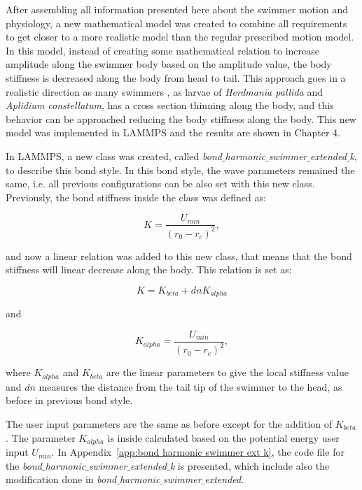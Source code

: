 After assembling all information presented here about the swimmer motion and physiology, a new mathematical model was created to combine all requirements to get closer to a more
realistic model than the regular prescribed motion model. In this model, instead of creating some mathematical relation to increase amplitude along the swimmer body based on the
amplitude value, the body stiffness is decreased along the body from head to tail. This  approach goes in a realistic direction as many swimmers , as larvae of \textit{Herdmania pallida} and
\textit{Aplidium constellatum}, has a cross section thinning along the body, and this behavior can be approached reducing the body stiffness along the body. This new model was
implemented in LAMMPS and the results are shown in Chapter 4. \par

In LAMMPS, a new class was created, called \textit{bond$\_$harmonic$\_$swimmer$\_$extended$\_$k}, to describe this bond style. In this bond style, the wave parameters remained the same, i.e. all previous configurations can be also set with this new class. 
Previously, the bond stiffness inside the class was defined as:

\begin{equation}
 K = \frac{U_{min}}{( r_{0} - r_{c})^2} ,
\end{equation}

and now a linear relation was added to this new class, that means that the bond stiffness will linear decrease along the body. This relation is set as:

\begin{equation}
 K = K_{beta} + dn K_{alpha}
\end{equation}

and

\begin{equation}
 K_{alpha} = \frac{U_{min}}{( r_{0} - r_{c})^2} ,
\end{equation}


where $K_{alpha}$ and $K_{beta}$ are the linear parameters to give the local stiffness value and $dn$ measures the distance from the tail tip of the swimmer to the head, as before
in previous bond style.\par

The user input parameters are the same as before except for the addition of $K_{beta}$. The parameter $K_{alpha}$ is inside calculated based on the potential energy user
input $U_{min}$. In Appendix~\ref{app:bond harmonic swimmer ext k}, the code file for the \textit{bond$\_$harmonic$\_$swimmer$\_$extended$\_$k} is presented, which include also
the modification done in \textit{bond$\_$harmonic$\_$swimmer$\_$extended}.








